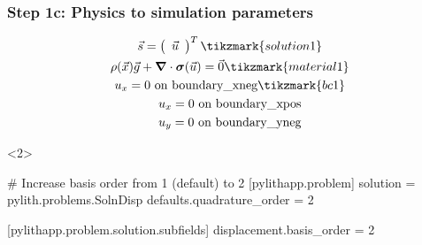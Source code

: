 \documentclass[aspectratio=169]{beamer}
\begin{document}
\begin{frame}[t,fragile]
  \frametitle{Step 1c: Physics to simulation parameters}
  \summary{}

  \begin{minipage}[t]{0.3\textwidth}
    {\scriptsize
    \begin{gather*}
    \vec{s} = \left(\begin{array}{c} \vec{u} \end{array}\right)^T \tikzmark{solution1}\\
    \rho(\vec{x}) \vec{g} + \tensor{\nabla} \cdot \tensor{\sigma}(\vec{u}) = \vec{0} \tikzmark{material1}\\
    u_x = 0 \text{ on boundary\_xneg} \tikzmark{bc1}\\
    u_x = 0 \text{ on boundary\_xpos} \\
    u_y = 0 \text{ on boundary\_yneg} \\
    \end{gather*}}
  \end{minipage}
  \hfill
  \begin{minipage}[t]{0.67\textwidth}
    \begin{onlyenv}<2>
      \begin{cfgcode}
        # Increase basis order from 1 (default) to 2
        [pylithapp.problem]
        solution = pylith.problems.SolnDisp
        defaults.quadrature_order = 2
        
        [pylithapp.problem.solution.subfields]
        displacement.basis_order = 2
      \end{cfgcode}
    \end{onlyenv}
  \end{minipage}

  
\end{frame}
\end{document}
